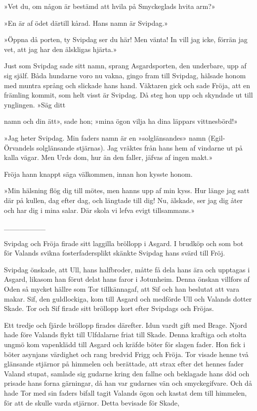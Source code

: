 »Vet du, om någon är bestämd att hvila på Smyckeglads hvita arm?»

»En är af ödet därtill kårad. Hans namn är Svipdag.»

»Öppna då porten, ty Svipdag ser du här! Men vänta! In vill jag icke,
förrän jag vet, att jag har den älskligas hjärta.»

Just som Svipdag sade sitt namn, sprang Asgardsporten, den underbare,
upp af sig själf. Båda hundarne voro nu vakna, gingo fram till Svipdag,
hälsade honom med muntra språng och slickade hans hand. Väktaren gick
och sade Fröja, att en främling kommit, som helt visst är Svipdag. Då
steg hon upp och skyndade ut till ynglingen. »Säg ditt

namn och din ätt», sade hon; »mina ögon vilja ha dina läppars
vittnesbörd!»

»Jag heter Svipdag. Min faders namn är en »solglänsandes» namn
(Egil-Örvandels solglänsande stjärnas). Jag vräktes från hans hem af
vindarne ut på kalla vägar. Men Urds dom, hur än den faller, jäfvas af
ingen makt.»

Fröja hann knappt säga välkommen, innan hon kysste honom.

»Min hälsning flög dig till mötes, men hanns upp af min kyss. Hur länge
jag satt där på kullen, dag efter dag, och längtade till dig! Nu,
älskade, ser jag dig åter och har dig i mina salar. Där skola vi lefva
evigt tillsammans.»

{\_\_\_\_\_\_\_\_}

Svipdag och Fröja firade sitt laggilla bröllopp i Asgard. I brudköp och
som bot för Valands svikna fosterfadersplikt skänkte Svipdag hans svärd
till Fröj.

Svipdag önskade, att Ull, hans halfbroder, måtte få dela hans ära och
upptagas i Asgard, likasom han förut delat hans faror i Jotunheim. Denna
önskan villfors af Oden så mycket hällre som Tor tillkännagaf, att Sif
och han beslutat att vara makar. Sif, den guldlockiga, kom till Asgard
och medförde Ull och Valands dotter Skade. Tor och Sif firade sitt
bröllopp kort efter Svipdags och Fröjas.

Ett tredje och fjärde bröllopp firades därefter. Idun vardt gift med
Brage. Njord hade före Valands flykt till Ulfdalarne friat till Skade.
Denna kraftiga och stolta ungmö kom vapenklädd till Asgard och kräfde
böter för slagen fader. Hon fick i böter asynjans värdighet och rang
bredvid Frigg och Fröja. Tor visade henne två glänsande stjärnor på
himmelen och berättade, att strax efter det hennes fader Valand stupat,
samlade sig gudarne kring den fallne och beklagade hans död och prisade
hans forna gärningar, då han var gudarnes vän och smyckegifvare. Och då
hade Tor med sin faders bifall tagit Valands ögon och kastat dem till
himmelen, för att de skulle varda stjärnor. Detta bevisade för Skade,

